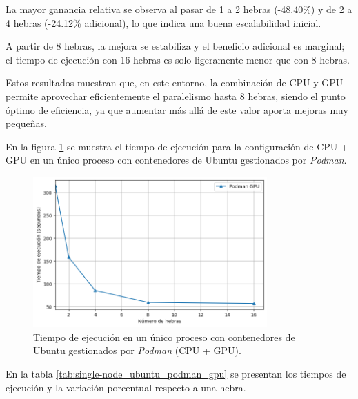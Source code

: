 La mayor ganancia relativa se observa al pasar de 1 a 2 hebras (-48.40\%) y de 2 a 4 hebras (-24.12\% adicional), lo que indica una buena escalabilidad inicial.

A partir de 8 hebras, la mejora se estabiliza y el beneficio adicional es marginal; el tiempo de ejecución con 16 hebras es solo ligeramente menor que con 8 hebras.

Estos resultados muestran que, en este entorno, la combinación de CPU y GPU permite aprovechar eficientemente el paralelismo hasta 8 hebras, siendo el punto óptimo de eficiencia, ya que aumentar más allá de este valor aporta mejoras muy pequeñas.

En la figura \ref{fig:single-node_ubuntu_podman_gpu_time} se muestra el tiempo de ejecución para la configuración de CPU + GPU en un único proceso con contenedores de Ubuntu gestionados por \textit{Podman}.

\begin{figure}[H]
    \centering
    \includegraphics[width=0.8\textwidth]{imagenes/cap5/single-node_ubuntu_podman_gpu_time.png}
    \caption{Tiempo de ejecución en un único proceso con contenedores de Ubuntu gestionados por \textit{Podman} (CPU + GPU).}
    \label{fig:single-node_ubuntu_podman_gpu_time}
\end{figure}

En la tabla \ref{tab:single-node_ubuntu_podman_gpu} se presentan los tiempos de ejecución y la variación porcentual respecto a una hebra.

